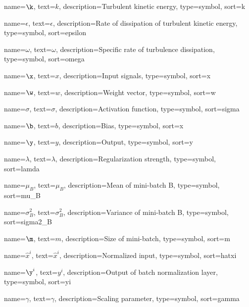 {
  name={$\k$},
  text={\ensuremath{k}},
  description={Turbulent kinetic energy},
  type=symbol,
  sort=k
}

{
  name={$\epsilon$},
  text={\ensuremath{\epsilon}},
  description={Rate of dissipation of turbulent kinetic energy},
  type=symbol,
  sort=epsilon
}

{
  name={$\omega$},
  text={\ensuremath{\omega}},
  description={Specific rate of turbulence dissipation},
  type=symbol,
  sort=omega
}

{
  name={$\x$},
  text={\ensuremath{x}},
  description={Input signals},
  type=symbol,
  sort=x
}

{
  name={$\w$},
  text={\ensuremath{w}},
  description={Weight vector},
  type=symbol,
  sort=w
}

{
  name={$\sigma$},
  text={\ensuremath{\sigma}},
  description={Activation function},
  type=symbol,
  sort=sigma
}

{
  name={$\b$},
  text={\ensuremath{b}},
  description={Bias},
  type=symbol,
  sort=x
}

{
  name={$\y$},
  text={\ensuremath{y}},
  description={Output},
  type=symbol,
  sort=y
}

{
  name={$\lambda$},
  text={\ensuremath{\lambda}},
  description={Regularization strength},
  type=symbol,
  sort=lamda
}

{
  name={$\mu_B$},
  text={\ensuremath{\mu_B}},
  description={Mean of mini-batch B},
  type=symbol,
  sort=mu_B
}

{
  name={$\sigma^2_B$},
  text={\ensuremath{\sigma^2_B}},
  description={Variance of mini-batch B},
  type=symbol,
  sort=sigma2_B
}

{
  name={$\m$},
  text={\ensuremath{m}},
  description={Size of mini-batch},
  type=symbol,
  sort=m
}

{
  name={$\hat{x}^i$},
  text={\ensuremath{\hat{x}^i}},
  description={Normalized input},
  type=symbol,
  sort=hatxi
}

{
  name={$\y^i$},
  text={\ensuremath{y^i}},
  description={Output of batch normalization layer},
  type=symbol,
  sort=yi
}

{
  name={$\gamma$},
  text={\ensuremath{\gamma}},
  description={Scaling parameter},
  type=symbol,
  sort=gamma
}

